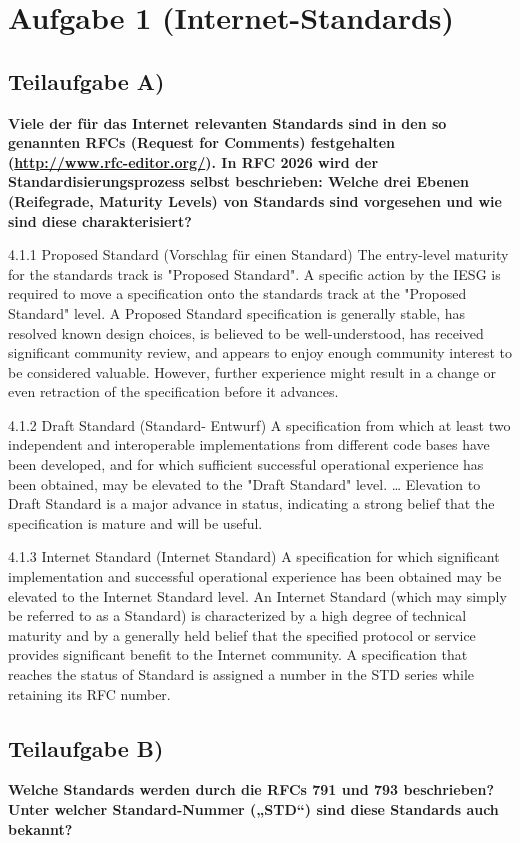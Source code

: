 \section{Aufgabe 1 (Internet-Standards)}

\subsection{Teilaufgabe A)}
\textbf{Viele der für das Internet relevanten Standards sind in den so genannten RFCs (Request
for Comments) festgehalten (\url{http://www.rfc-editor.org/}). In RFC 2026 wird
der Standardisierungsprozess selbst beschrieben: Welche drei Ebenen (Reifegrade, Maturity
Levels) von Standards sind vorgesehen und wie sind diese charakterisiert?}

4.1.1 Proposed Standard (Vorschlag für einen Standard)
The entry-level maturity for the standards track is "Proposed Standard". A specific action by
the IESG is required to move a specification onto the standards track at the "Proposed
Standard" level. A Proposed Standard specification is generally stable, has resolved known
design choices, is believed to be well-understood, has received significant community
review, and appears to enjoy enough community interest to be considered valuable.
However, further experience might result in a change or even retraction of the specification
before it advances.

4.1.2 Draft Standard (Standard- Entwurf)
A specification from which at least two independent and interoperable implementations
from different code bases have been developed, and for which sufficient successful
operational experience has been obtained, may be elevated to the "Draft Standard" level.
… Elevation to Draft Standard is a major advance in status, indicating a strong belief that
the specification is mature and will be useful.

4.1.3 Internet Standard (Internet Standard)
A specification for which significant implementation and successful operational
experience has been obtained may be elevated to the Internet Standard level. An Internet
Standard (which may simply be referred to as a Standard) is characterized by a high degree
of technical maturity and by a generally held belief that the specified protocol or service
provides significant benefit to the Internet community. A specification that reaches the
status of Standard is assigned a number in the STD series while retaining its RFC
number.

\subsection{Teilaufgabe B)}
\textbf{Welche Standards werden durch die RFCs 791 und 793 beschrieben? Unter welcher
Standard-Nummer („STD“) sind diese Standards auch bekannt?}

